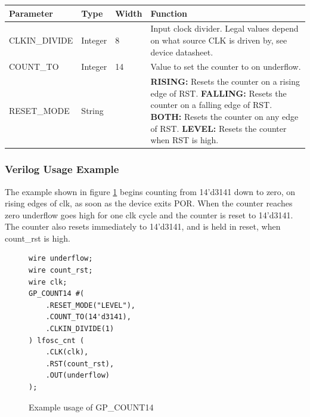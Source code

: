 \documentclass[11pt]{article}
\begin{document}
\begin{tabularx}{5in}{|l|l|l|X|}
\hline
{\bfseries Parameter} & {\bfseries Type} & {\bfseries Width} & {\bfseries Function} \\
\hline
CLKIN\_DIVIDE & Integer & 8 &
	Input clock divider. Legal values depend on what source CLK is driven by, see device datasheet.\\
\hline
COUNT\_TO & Integer & 14 & Value to set the counter to on underflow. \\
\hline
RESET\_MODE & String &  & 
	{\bfseries RISING: } \newline Resets the counter on a rising edge of RST. \newline
	{\bfseries FALLING: } \newline Resets the counter on a falling edge of RST. \newline
	{\bfseries BOTH: } \newline Resets the counter on any edge of RST. \newline
	{\bfseries LEVEL: } \newline Resets the counter when RST is high. \\
\hline
\end{tabularx}

\pagebreak
\subsubsection{Verilog Usage Example}

The example shown in figure \ref{gp-count14-example} begins counting from 14'd3141 down to zero, on rising edges of clk,
as soon as the device exits POR. When the counter reaches zero underflow goes high for one clk cycle and the counter is 
reset to 14'd3141. The counter also resets immediately to 14'd3141, and is held in reset, when count\_rst is high.

\begin{figure}[h]
\begin{lstlisting}
wire underflow;
wire count_rst;
wire clk;
GP_COUNT14 #(
	.RESET_MODE("LEVEL"),
	.COUNT_TO(14'd3141),
	.CLKIN_DIVIDE(1)
) lfosc_cnt (
	.CLK(clk),
	.RST(count_rst),
	.OUT(underflow)
);
\end{lstlisting}
\caption{Example usage of GP\_COUNT14}
\label{gp-count14-example}
\end{figure}

\end{document}
